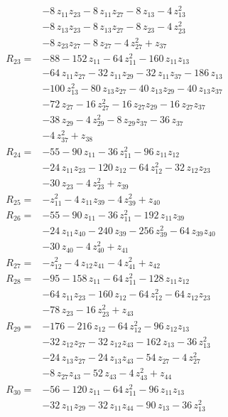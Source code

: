 \begin{align*}
&-8\,z_{11}z_{23} -8\,z_{11}z_{27} -8\,z_{13} -4\,z_{13}^{2}\\
&-8\,z_{13}z_{23} -8\,z_{13}z_{27} -8\,z_{23} -4\,z_{23}^{2}\\
&-8\,z_{23}z_{27} -8\,z_{27} -4\,z_{27}^{2} +z_{37}\\[2pt]
R_{23}={}&-88 -152\,z_{11} -64\,z_{11}^{2} -160\,z_{11}z_{13}\\
&-64\,z_{11}z_{27} -32\,z_{11}z_{29} -32\,z_{11}z_{37} -186\,z_{13}\\
&-100\,z_{13}^{2} -80\,z_{13}z_{27} -40\,z_{13}z_{29} -40\,z_{13}z_{37}\\
&-72\,z_{27} -16\,z_{27}^{2} -16\,z_{27}z_{29} -16\,z_{27}z_{37}\\
&-38\,z_{29} -4\,z_{29}^{2} -8\,z_{29}z_{37} -36\,z_{37}\\
&-4\,z_{37}^{2} +z_{38}\\[2pt]
R_{24}={}&-55 -90\,z_{11} -36\,z_{11}^{2} -96\,z_{11}z_{12}\\
&-24\,z_{11}z_{23} -120\,z_{12} -64\,z_{12}^{2} -32\,z_{12}z_{23}\\
&-30\,z_{23} -4\,z_{23}^{2} +z_{39}\\[2pt]
R_{25}={}&-z_{11}^{2} -4\,z_{11}z_{39} -4\,z_{39}^{2} +z_{40}\\[2pt]
R_{26}={}&-55 -90\,z_{11} -36\,z_{11}^{2} -192\,z_{11}z_{39}\\
&-24\,z_{11}z_{40} -240\,z_{39} -256\,z_{39}^{2} -64\,z_{39}z_{40}\\
&-30\,z_{40} -4\,z_{40}^{2} +z_{41}\\[2pt]
R_{27}={}&-z_{12}^{2} -4\,z_{12}z_{41} -4\,z_{41}^{2} +z_{42}\\[2pt]
R_{28}={}&-95 -158\,z_{11} -64\,z_{11}^{2} -128\,z_{11}z_{12}\\
&-64\,z_{11}z_{23} -160\,z_{12} -64\,z_{12}^{2} -64\,z_{12}z_{23}\\
&-78\,z_{23} -16\,z_{23}^{2} +z_{43}\\[2pt]
R_{29}={}&-176 -216\,z_{12} -64\,z_{12}^{2} -96\,z_{12}z_{13}\\
&-32\,z_{12}z_{27} -32\,z_{12}z_{43} -162\,z_{13} -36\,z_{13}^{2}\\
&-24\,z_{13}z_{27} -24\,z_{13}z_{43} -54\,z_{27} -4\,z_{27}^{2}\\
&-8\,z_{27}z_{43} -52\,z_{43} -4\,z_{43}^{2} +z_{44}\\[2pt]
R_{30}={}&-56 -120\,z_{11} -64\,z_{11}^{2} -96\,z_{11}z_{13}\\
&-32\,z_{11}z_{29} -32\,z_{11}z_{44} -90\,z_{13} -36\,z_{13}^{2}\\

\end{align*}
